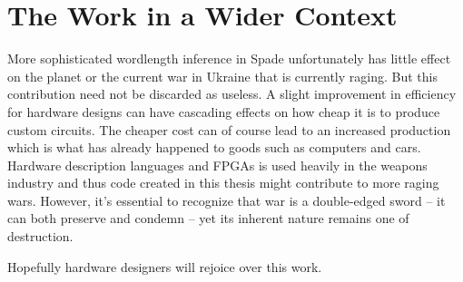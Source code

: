\section{The Work in a Wider Context}
More sophisticated wordlength inference in Spade unfortunately has little effect on the planet or the current war in Ukraine that is currently raging. But this contribution need not be discarded as useless. A slight improvement in efficiency for hardware designs can have cascading effects on how cheap it is to produce custom circuits. The cheaper cost can of course lead to an increased production which is what has already happened to goods such as computers and cars. Hardware description languages and FPGAs is used heavily in the weapons industry and thus code created in this thesis might contribute to more raging wars. However, it's essential to recognize that war is a double-edged sword -- it can both preserve and condemn -- yet its inherent nature remains one of destruction.

Hopefully hardware designers will rejoice over this work.
